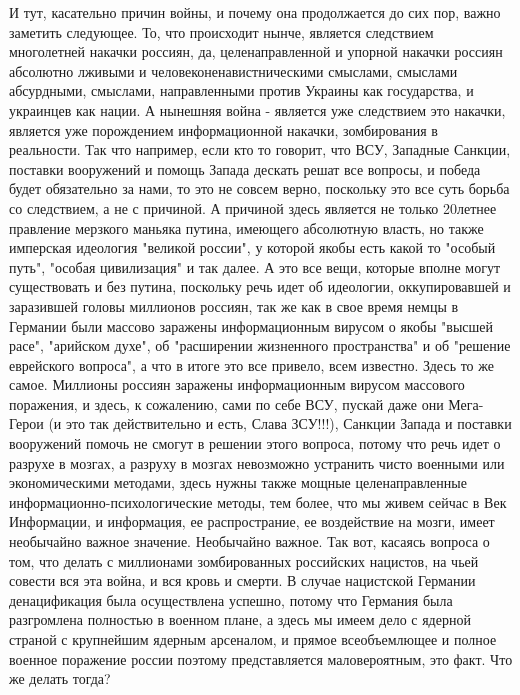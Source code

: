 И тут, касательно причин войны, и почему она продолжается до сих пор, важно
заметить следующее. То, что происходит нынче, является следствием многолетней
накачки россиян, да, целенаправленной и упорной накачки россиян абсолютно
лживыми и человеконенавистническими смыслами, смыслами абсурдными, смыслами,
направленными против Украины как государства, и украинцев как нации. А нынешняя
война - является уже следствием это накачки, является уже порождением
информационной накачки, зомбирования в реальности. Так что например, если кто
то говорит, что ВСУ, Западные Санкции, поставки вооружений и помощь Запада
дескать решат все вопросы, и победа будет обязательно за нами, то это не совсем
верно, поскольку это все суть борьба со следствием, а не с причиной.  А
причиной здесь является не только 20летнее правление мерзкого маньяка путина,
имеющего абсолютную власть, но также имперская идеология "великой россии", у
которой якобы есть какой то "особый путь", "особая цивилизация" и так далее. А
это все вещи, которые вполне могут существовать и без путина, поскольку речь
идет об идеологии, оккупировавшей и заразившей головы миллионов россиян, так же
как в свое время немцы в Германии были массово заражены информационным вирусом
о якобы "высшей расе", "арийском духе", об "расширении жизненного пространства"
и об "решение еврейского вопроса", а что в итоге это все привело, всем
известно. Здесь то же самое. Миллионы россиян заражены информационным вирусом
массового поражения, и здесь, к сожалению, сами по себе ВСУ, пускай даже они
Мега-Герои (и это так действительно и есть, Слава ЗСУ!!!), Санкции Запада и
поставки вооружений помочь не смогут в решении этого вопроса, потому что речь
идет о разрухе в мозгах, а разруху в мозгах невозможно устранить чисто военными
или экономическими методами, здесь нужны также мощные целенаправленные
информационно-психологические методы, тем более, что мы живем сейчас в Век
Информации, и информация, ее распространие, ее воздействие на мозги, имеет
необычайно важное значение. Необычайно важное.  Так вот, касаясь вопроса о том,
что делать с миллионами зомбированных российских нацистов, на чьей совести вся
эта война, и вся кровь и смерти. В случае нацистской Германии денацификация
была осуществлена успешно, потому что Германия была разгромлена полностью в
военном плане, а здесь мы имеем дело с ядерной страной с крупнейшим ядерным
арсеналом, и прямое всеобъемлющее и полное военное поражение россии поэтому
представляется маловероятным, это факт.  Что же делать тогда?

